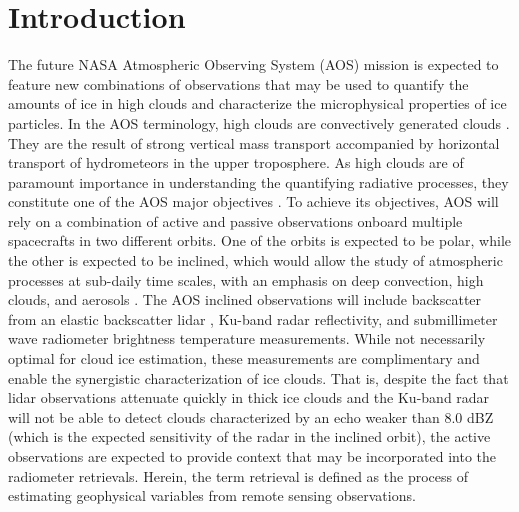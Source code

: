 \documentclass{ametsocV6.1}
\begin{document}
\section{Introduction}
The future NASA Atmospheric Observing System (AOS) mission \citep{braun2022} is expected to feature new combinations of observations that may be used to quantify the amounts of ice in high clouds and characterize the microphysical properties of ice particles. In the AOS terminology, high clouds are convectively generated clouds \citep{braun2022}. They are the result of strong vertical mass transport accompanied by horizontal transport of hydrometeors in the upper troposphere.  As high clouds are of paramount importance in understanding the quantifying radiative processes, they constitute one of the AOS major objectives \citep{braun2022}. To achieve its objectives, AOS will rely on a combination of active and passive observations onboard multiple spacecrafts in two different orbits.  One of the orbits is expected to be polar, while the other is expected to be inclined, which would allow the study of atmospheric processes at sub-daily time scales, with an emphasis on deep convection, high clouds, and aerosols \citep{braun2022,yorks2022}. The AOS inclined observations will include backscatter from an elastic backscatter lidar \citep{weitkamp2006}, Ku-band radar reflectivity, and submillimeter wave radiometer brightness temperature measurements. 
While not necessarily optimal for cloud ice estimation, these measurements are complimentary and enable the synergistic characterization of ice clouds. That is, despite the fact that lidar observations attenuate quickly in thick ice clouds and the Ku-band radar will not be able to detect clouds characterized by an echo weaker than 8.0 dBZ (which is the expected sensitivity of the radar in the inclined orbit), the active observations are expected to provide context that may be incorporated into the radiometer retrievals. Herein, the term retrieval is defined as the process of estimating geophysical variables from remote sensing observations.
\end{document}
